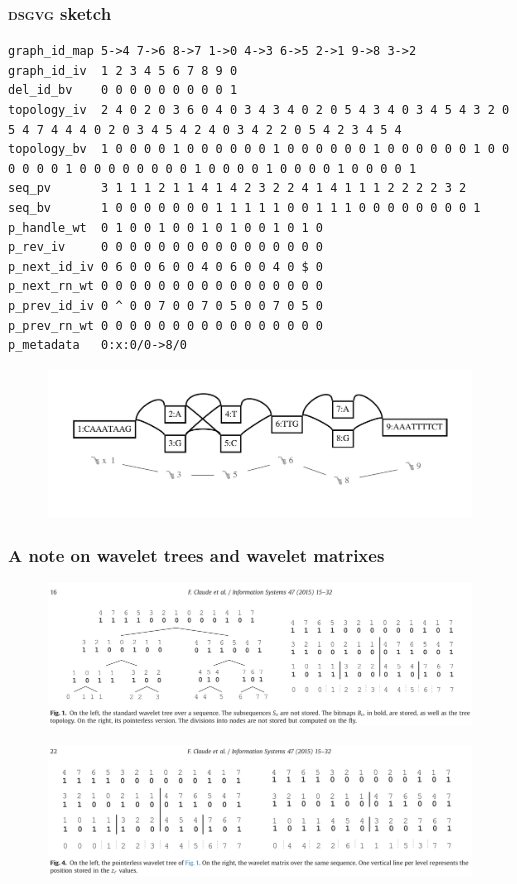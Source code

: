 \documentclass{beamer}
\begin{document}
\begin{frame}[fragile]
  \frametitle{\textsc{dsgvg} sketch}
      {\tiny
\begin{verbatim}
graph_id_map 5->4 7->6 8->7 1->0 4->3 6->5 2->1 9->8 3->2 
graph_id_iv	 1 2 3 4 5 6 7 8 9 0 
del_id_bv    0 0 0 0 0 0 0 0 0 1
topology_iv  2 4 0 2 0 3 6 0 4 0 3 4 3 4 0 2 0 5 4 3 4 0 3 4 5 4 3 2 0 5 4 7 4 4 4 0 2 0 3 4 5 4 2 4 0 3 4 2 2 0 5 4 2 3 4 5 4
topology_bv  1 0 0 0 0 1 0 0 0 0 0 0 1 0 0 0 0 0 0 1 0 0 0 0 0 0 1 0 0 0 0 0 0 1 0 0 0 0 0 0 0 0 1 0 0 0 0 1 0 0 0 0 1 0 0 0 0 1
seq_pv       3 1 1 1 2 1 1 4 1 4 2 3 2 2 4 1 4 1 1 1 2 2 2 2 3 2 
seq_bv       1 0 0 0 0 0 0 0 1 1 1 1 1 0 0 1 1 1 0 0 0 0 0 0 0 0 1
p_handle_wt  0 1 0 0 1 0 0 1 0 1 0 0 1 0 1 0 
p_rev_iv     0 0 0 0 0 0 0 0 0 0 0 0 0 0 0 0 
p_next_id_iv 0 6 0 0 6 0 0 4 0 6 0 0 4 0 $ 0 
p_next_rn_wt 0 0 0 0 0 0 0 0 0 0 0 0 0 0 0 0 
p_prev_id_iv 0 ^ 0 0 7 0 0 7 0 5 0 0 7 0 5 0 
p_prev_rn_wt 0 0 0 0 0 0 0 0 0 0 0 0 0 0 0 0 
p_metadata   0:x:0/0->8/0 
\end{verbatim}
      }
        \begin{figure}
    \includegraphics[scale=0.4,center]{w_graph.pdf}
  \end{figure}

\end{frame}

\begin{frame}
  \frametitle{A note on wavelet trees and wavelet matrixes}
  \begin{figure}
    \includegraphics[scale=0.12,center]{wt_ptr_and_non.png}
  \end{figure}
  \begin{figure}
    \includegraphics[scale=0.12,center]{wt_ptr_and_wm.png}
  \end{figure}
\end{frame}
\end{document}
